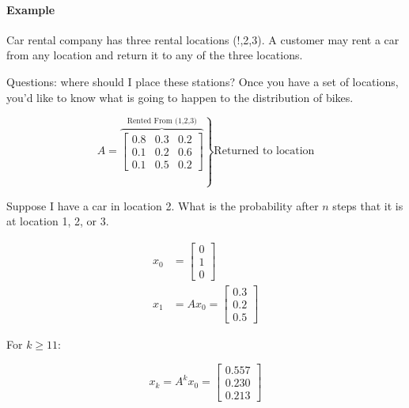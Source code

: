 \paragraph{Example} Car rental company has three rental locations (!,2,3). A customer may rent a car from any location and return it to any of the three locations.

Questions: where should I place these stations? Once you have a set of locations, you'd like to know what is going to happen to the distribution of bikes.

\[
  A = 
  \left.
  \overbrace{
  \begin{bmatrix}
    0.8 & 0.3 & 0.2 \\
    0.1 & 0.2 & 0.6 \\
    0.1 & 0.5 & 0.2
  \end{bmatrix}}^{\text{Rented From (1,2,3)}}
  \right\} \text{Returned to location}
\]

Suppose I have a car in location 2. What is the probability after $n$ steps that it is at location 1, 2, or 3.

\begin{align*}
  x_0 &= \begin{bmatrix}
    0 \\ 1 \\0
  \end{bmatrix} \\
  x_1 &= A x_0 = 
  \begin{bmatrix}
    0.3 \\ 0.2 \\ 0.5
  \end{bmatrix}
\end{align*}

For $k \geq 11$:

\[
  x_k = A^k x_0 = 
  \begin{bmatrix}
    0.557 \\ 0.230 \\ 0.213
  \end{bmatrix}
\]